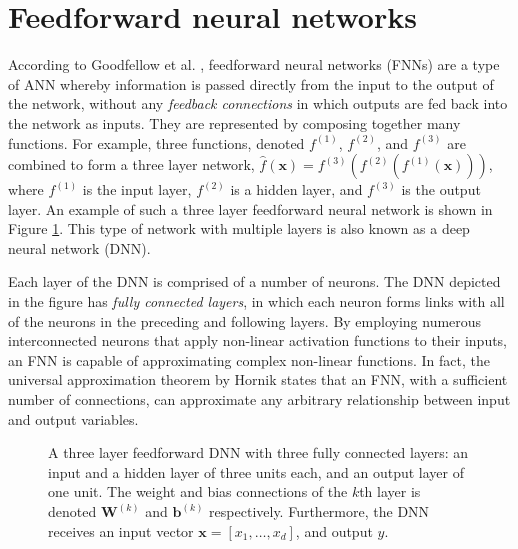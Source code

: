 \section{Feedforward neural networks}
\label{sec:fnn}

According to Goodfellow et al. \cite{Goodfellow2016}, feedforward neural networks (FNNs) are a type of ANN whereby information is passed directly from the input to the output of the network, without any \emph{feedback connections} in which outputs are fed back into the network as inputs.
They are represented by composing together many functions.
For example, three functions, denoted $f^{(1)}$, $f^{(2)}$, and $f^{(3)}$ are combined to form a three layer network, 
$\hat{f}(\mathbf{x}) = f^{(3)}( f^{(2)}( f^{(1)}(\mathbf{x}) ) )$, where $f^{(1)}$ is the input layer, $f^{(2)}$ is a hidden layer, and $f^{(3)}$ is the output layer.
An example of such a three layer feedforward neural network is shown in Figure \ref{fig:neural_network}.
This type of network with multiple layers is also known as a deep neural network (DNN).

Each layer of the DNN is comprised of a number of neurons.
The DNN depicted in the figure has \emph{fully connected layers}, in which each neuron forms links with all of the neurons in the preceding and following layers.
By employing numerous interconnected neurons that apply non-linear activation functions to their inputs, an FNN is capable of approximating complex non-linear functions.
In fact, the universal approximation theorem by Hornik \cite{Hornik1989} states that an FNN, with a sufficient number of connections, can approximate any arbitrary relationship between input and output variables.

\begin{figure}[htb!]
    \centering
    
    \caption[A feed forward neural network]{
    A three layer feedforward DNN with three fully connected layers: an input and a hidden layer of three units each, and an output layer of one unit. 
    The weight and bias connections of the $k$th layer is denoted $\mathbf{W}^{(k)}$ and $\mathbf{b}^{(k)}$ respectively.
    Furthermore, the DNN receives an input vector $\bm{x}=[x_1, \ldots ,x_d]$, and output $\hat{y}$.}
    \label{fig:neural_network}
\end{figure}


